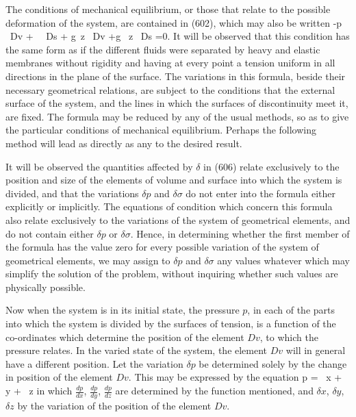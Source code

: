 \documentclass[12pt]{article}
\newcommand{\dd}{\delta}
\begin{document}
The conditions of mechanical equilibrium, or those that relate to the possible deformation of the system, are contained in (602), which may also be written
\eqs -\int p \, \dd \, Dv + \int \sigma \, \dd \, Ds + \int g\gamma \, \dd z \, Dv +\int g \Gamma\, \dd z \, Ds =0.   \label{606} \eqe
It will be observed that this condition has the same form as if the different fluids were separated by heavy and elastic membranes without rigidity and having at every point a tension uniform in all directions in the plane of the surface. The variations in this formula, beside their necessary geometrical relations, are subject to the conditions that the external surface of the system, and the lines in which the surfaces of discontinuity meet it, are fixed. The formula may be reduced by any of the usual methods, so as to give the particular conditions of mechanical equilibrium. Perhaps the following method will lead as directly as any to the desired result.

It will be observed the quantities affected by $\dd$ in (606) relate exclusively to the position and size of the elements of volume and surface into which the system is divided, and that the variations $\dd p$ and $\dd \sigma$ do not enter into the formula either explicitly or implicitly. The equations of condition which concern this formula also relate exclusively to the variations of the system of geometrical elements, and do not contain either $\dd p$ or $\dd \sigma$. Hence, in determining whether the first member of the formula has the value zero for every possible variation of the system of geometrical elements, we may assign to $\dd p$ and $\dd \sigma$ any values whatever which may simplify the solution of the problem, without inquiring whether such values are physically possible.

Now when the system is in its initial state, the pressure $p$, in each of the parts into which the system is divided by the surfaces of tension, is a function of the co-ordinates which determine the position of the element $Dv$, to which the pressure relates. In the varied state of the system, the element $Dv$ will in general have a different position. Let the variation $\dd p$ be determined solely by the change in position of the element $Dv$. This may be expressed by the equation
\eqs \dd p = \, \dd x + \, \dd y + \, \dd z \label{607} \eqe
in which $\frac{dp}{dx}$, $\frac{dp}{dy}$, $\frac{dp}{dz}$ are determined by the function mentioned, and $\dd x$, $\dd y$, $\dd z$ by the variation of the position of the element $Dv$.
\end{document}
